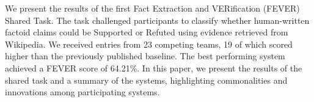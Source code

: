 We present the results of the first Fact Extraction and VERification (FEVER) Shared Task. The task challenged participants to classify whether human-written factoid claims could be Supported or Refuted using evidence retrieved from Wikipedia. We received entries from 23 competing teams, 19 of which scored higher than the previously published baseline. The best performing system achieved a FEVER score of 64.21\%. In this paper, we present the results of the shared task and a summary of the systems, highlighting commonalities and innovations among participating systems.
